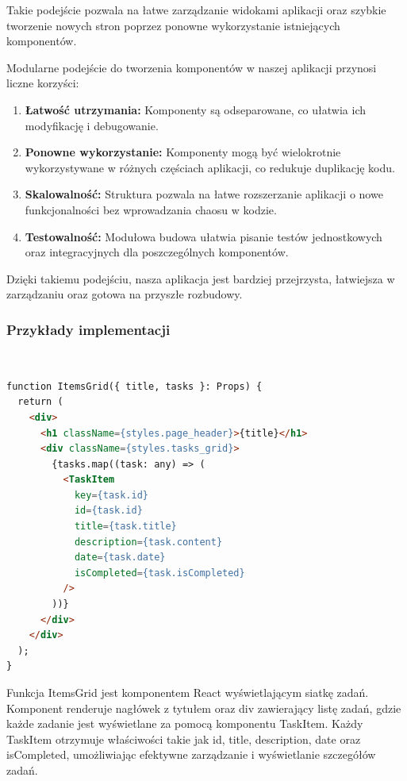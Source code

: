 \noindent Takie podejście pozwala na łatwe zarządzanie widokami aplikacji oraz szybkie tworzenie nowych stron poprzez ponowne wykorzystanie istniejących komponentów.
\\


\noindent Modularne podejście do tworzenia komponentów w naszej aplikacji przynosi liczne korzyści:
\begin{enumerate}
    \item {\bf Łatwość utrzymania:} Komponenty są odseparowane, co ułatwia ich modyfikację i debugowanie.
    \item {\bf Ponowne wykorzystanie:} Komponenty mogą być wielokrotnie wykorzystywane w różnych częściach aplikacji, co redukuje duplikację kodu.
    \item {\bf Skalowalność:} Struktura pozwala na łatwe rozszerzanie aplikacji o nowe funkcjonalności bez wprowadzania chaosu w kodzie.
    \item {\bf Testowalność:} Modułowa budowa ułatwia pisanie testów jednostkowych oraz integracyjnych dla poszczególnych komponentów.
\end{enumerate}

\noindent Dzięki takiemu podejściu, nasza aplikacja jest bardziej przejrzysta, łatwiejsza w zarządzaniu oraz gotowa na przyszłe rozbudowy.

\subsubsection{Przykłady implementacji}

\\

\begin{lstlisting}[language=html, caption=ItemsGrid example]
function ItemsGrid({ title, tasks }: Props) {
  return (
    <div>
      <h1 className={styles.page_header}>{title}</h1>
      <div className={styles.tasks_grid}>
        {tasks.map((task: any) => (
          <TaskItem
            key={task.id}
            id={task.id}
            title={task.title}
            description={task.content}
            date={task.date}
            isCompleted={task.isCompleted}
          />
        ))}
      </div>
    </div>
  );
}
\end{lstlisting}
Funkcja ItemsGrid jest komponentem React wyświetlającym siatkę zadań. Komponent renderuje nagłówek z tytułem oraz div zawierający listę zadań, gdzie każde zadanie jest wyświetlane za pomocą komponentu TaskItem. Każdy TaskItem otrzymuje właściwości takie jak id, title, description, date oraz isCompleted, umożliwiając efektywne zarządzanie i wyświetlanie szczegółów zadań.
\\

